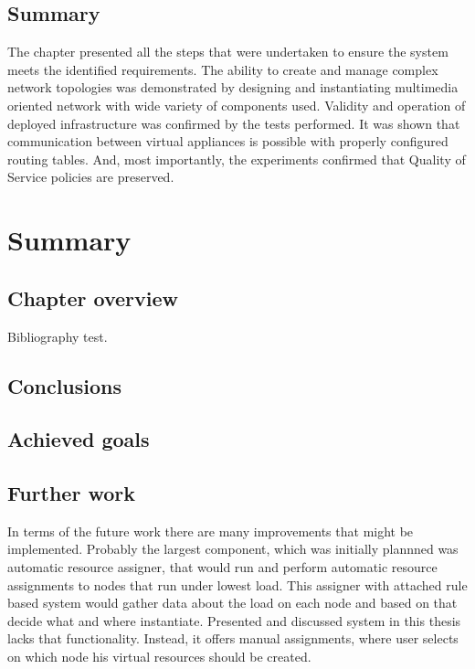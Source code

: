 \documentclass[11pt]{book}
\begin{document}
    \section*{Summary}

      The chapter presented all the steps that were undertaken to ensure the system meets the identified requirements.
      The ability to create and manage complex network topologies was demonstrated by designing and instantiating
      multimedia oriented network with wide variety of components used. Validity and operation of deployed
      infrastructure was confirmed by the tests performed. It was shown that communication between virtual appliances is
      possible with properly configured routing tables. And, most importantly, the experiments confirmed that Quality of
      Service policies are preserved.


  \chapter{Summary}

    \section*{Chapter overview}

      Bibliography \cite{mittelbach2004} test.
	
		

    \section{Conclusions}
	
		

    \section{Achieved goals}

		

    \section{Further work}

	
      In terms of the future work there are many improvements that might be implemented. Probably the largest component,
      which was initially plannned was automatic resource assigner, that would run and perform automatic resource
      assignments to nodes that run under lowest load. This assigner with attached rule based system would gather data
      about the load on each node and based on that decide what and where instantiate. Presented and discussed system in
      this thesis lacks that functionality. Instead, it offers manual assignments, where user selects on which node his
      virtual resources should be created.


  
  
\end{document}
